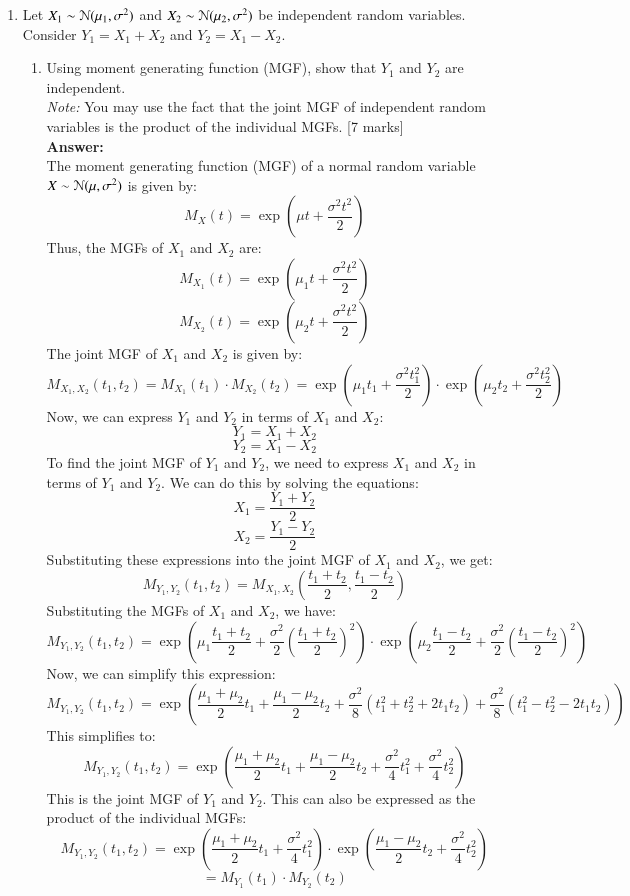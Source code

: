 \documentclass[12pt]{article}
\begin{document}
\begin{enumerate}

\item Let $X_1 \sim \EuScript{N}(\mu_1, \sigma^2)$ and $X_2 \sim \EuScript{N}(\mu_2, \sigma^2)$ be independent random variables. Consider $Y_1 = X_1+X_2$ and $Y_2 = X_1-X_2$.   

\begin{enumerate}
\item Using moment generating function (MGF), show that $Y_1$ and $Y_2$ are independent. \\
\emph{Note:} You may use the fact that the joint MGF of independent random variables is the product of the individual MGFs. 
			\hfill [7 marks]
%
\\
\textbf{Answer:}
\\
The moment generating function (MGF) of a normal random variable $X \sim \EuScript{N}(\mu, \sigma^2)$ is given by:
\[
M_X(t) = \exp\left(\mu t + \frac{\sigma^2 t^2}{2}\right)
\]
Thus, the MGFs of $X_1$ and $X_2$ are:
\[
M_{X_1}(t) = \exp\left(\mu_1 t + \frac{\sigma^2 t^2}{2}\right)
\]
\[
M_{X_2}(t) = \exp\left(\mu_2 t + \frac{\sigma^2 t^2}{2}\right)
\]
The joint MGF of $X_1$ and $X_2$ is given by:
\[
M_{X_1, X_2}(t_1, t_2) = M_{X_1}(t_1) \cdot M_{X_2}(t_2) = \exp\left(\mu_1 t_1 + \frac{\sigma^2 t_1^2}{2}\right) \cdot \exp\left(\mu_2 t_2 + \frac{\sigma^2 t_2^2}{2}\right)
\]
Now, we can express $Y_1$ and $Y_2$ in terms of $X_1$ and $X_2$:
\[
Y_1 = X_1 + X_2
\]
\[
Y_2 = X_1 - X_2
\]
To find the joint MGF of $Y_1$ and $Y_2$, we need to express $X_1$ and $X_2$ in terms of $Y_1$ and $Y_2$. We can do this by solving the equations:
\[
X_1 = \frac{Y_1 + Y_2}{2}
\]
\[
X_2 = \frac{Y_1 - Y_2}{2}
\]
Substituting these expressions into the joint MGF of $X_1$ and $X_2$, we get:
\[
M_{Y_1, Y_2}(t_1, t_2) = M_{X_1, X_2}\left(\frac{t_1 + t_2}{2}, \frac{t_1 - t_2}{2}\right)
\]
Substituting the MGFs of $X_1$ and $X_2$, we have:
\[
M_{Y_1, Y_2}(t_1, t_2) = \exp\left(\mu_1 \frac{t_1 + t_2}{2} + \frac{\sigma^2}{2}\left(\frac{t_1 + t_2}{2}\right)^2\right) \cdot \exp\left(\mu_2 \frac{t_1 - t_2}{2} + \frac{\sigma^2}{2}\left(\frac{t_1 - t_2}{2}\right)^2\right)
\]
Now, we can simplify this expression:
\[
M_{Y_1, Y_2}(t_1, t_2) = \exp\left(\frac{\mu_1 + \mu_2}{2} t_1 + \frac{\mu_1 - \mu_2}{2} t_2 + \frac{\sigma^2}{8}\left(t_1^2 + t_2^2 + 2t_1 t_2\right) + \frac{\sigma^2}{8}\left(t_1^2 - t_2^2 - 2t_1 t_2\right)\right)
\]
This simplifies to:
\[
\boxed {M_{Y_1, Y_2}(t_1, t_2) = \exp\left(\frac{\mu_1 + \mu_2}{2} t_1 + \frac{\mu_1 - \mu_2}{2} t_2 + \frac{\sigma^2}{4} t_1^2 + \frac{\sigma^2}{4} t_2^2\right)}
\]
This is the joint MGF of $Y_1$ and $Y_2$. This can also be expressed as the product of the individual MGFs:
\[
M_{Y_1, Y_2}(t_1, t_2) = \exp\left(\frac{\mu_1 + \mu_2}{2} t_1 + \frac{\sigma^2}{4} t_1^2 \right) \cdot \exp\left(\frac{\mu_1 - \mu_2}{2} t_2 + \frac{\sigma^2}{4} t_2^2\right)
\]
\[
= M_{Y_1}(t_1) \cdot M_{Y_2}(t_2)
\]


\end{enumerate}
\end{enumerate}
\end{document}
